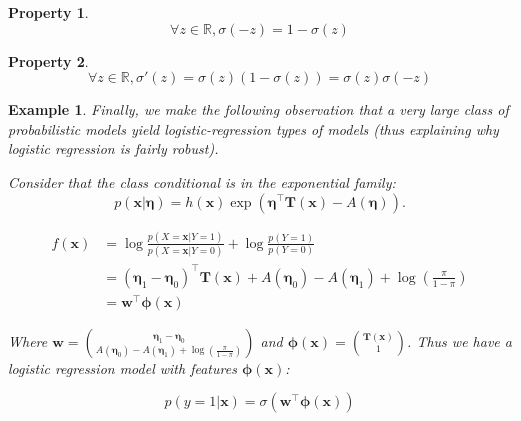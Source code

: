 \documentclass[12pt]{report}
\renewcommand{\emph}[1]{\color{violet}#1\color{black}{}}
\def\wb{\mathbf{w}}
\def\xb{\mathbf{x}}
\def\ts{\top}
\def\etab{{\boldsymbol \eta}}
\def\bphi{{\boldsymbol \phi}}
\newtheorem{example}{Example}[section]
\newtheorem{property}{Property}[section]
\begin{document}
    \begin{property}
        $$
        \forall z \in \mathbb{R}, \sigma(-z)=1-\sigma(z)
        $$
    \end{property}
    \begin{property}
        $$
        \forall z \in \mathbb{R}, \sigma ' (z) = \sigma(z)(1-\sigma(z)) = \sigma(z)\sigma(-z)
         $$
    \end{property}

\begin{example}
Finally, we make the following observation that a very large class of probabilistic models yield logistic-regression types of models (thus explaining why logistic regression is fairly robust).

Consider that the class conditional is in the \emph{exponential family}:
    $$
    p(\xb|\etab) = h(\xb) \exp(\etab^\top \mathbf{T}(\xb) - A(\etab) ).
    $$

    \begin{align*}
    f(\xb) &= \log\frac{p(X=\xb | Y=1)}{p(X=\xb | Y=0)} + \log\frac{p(Y=1)}{p(Y=0)} \\
    &= (\etab_1 - \etab_0)^\top \mathbf{T}(\xb) + A(\etab_0)-A(\etab_1) + \log(\frac{\pi}{1-\pi}) \\
    &= \wb^\top \bphi(\xb)
    \end{align*}

    Where $\wb = {\etab_1-\etab_0 \choose  A(\etab_0)-A(\etab_1) + \log(\frac{\pi}{1-\pi}) }$ and $\bphi(\xb) = {\mathbf{T}(\xb) \choose  1 }$. Thus we have a logistic regression model with features $\bphi(\xb)$:

    $$
    p(y=1|\xb) = \sigma(\wb^{\ts} \bphi(\xb))
    $$

\end{example}
\end{document}
